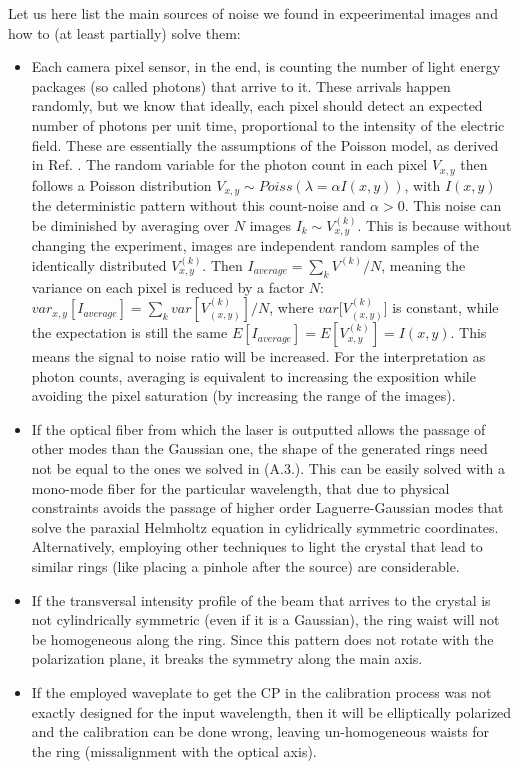 \documentclass[11pt, a4paper, twoside]{article} %
\begin{document}
Let us here list the main sources of noise we found in expeerimental images and how to (at least partially) solve them:
\begin{itemize}
\item Each camera pixel sensor, in the end, is counting the number of light energy packages (so called photons) that arrive to it. These arrivals happen randomly, but we know that ideally, each pixel should detect an expected number of photons per unit time, proportional to the intensity of the electric field. These are essentially the assumptions of the Poisson model, as derived in Ref. \cite{Poiss}. The random variable for the photon count in each pixel $V_{x,y}$ then follows a Poisson distribution $V_{x,y}\sim Poiss(\lambda=\alpha I(x,y))$, with $I(x,y)$ the deterministic pattern without this count-noise and $\alpha>0$. This noise can be diminished by averaging over $N$ images $I_k\sim V^{(k)}_{x,y}$. This is because without changing the experiment, images are independent random samples of the identically distributed $V^{(k)}_{x,y}$. Then $I_{average}=\sum_{k}V^{(k)}/N$, meaning the variance on each pixel is reduced by a factor $N$: $var_{x,y}[I_{average}]=\sum_k var[V_{(x,y)}^{(k)}]/N$, where $var[V_{(x,y)}^{(k)}$] is constant, while the expectation is still the same $E[I_{average}]=E[V_{x,y}^{(k)}]=I(x,y)$. This means the signal to noise ratio will be increased. For the interpretation as photon counts, averaging is equivalent to increasing the exposition while avoiding the pixel saturation (by increasing the range of the images).

\item If the optical fiber from which the laser is outputted allows the passage of other modes than the Gaussian one, the shape of the generated rings need not be equal to the ones we solved in (A.3.). This can be easily solved with a mono-mode fiber for the particular wavelength, that due to physical constraints avoids the passage of higher order Laguerre-Gaussian modes that solve the paraxial Helmholtz equation in cylidrically symmetric coordinates. Alternatively, employing other techniques to light the crystal that lead to similar rings (like placing a pinhole after the source) are considerable.

\item If the transversal intensity profile of the beam that arrives to the crystal is not cylindrically symmetric (even
if it is a Gaussian), the ring waist will not be homogeneous along the ring. Since this pattern does not rotate with the polarization plane, it breaks the symmetry along the main axis.
\item If the employed waveplate to get the CP in the calibration process was not exactly designed for the input wavelength, then it will be elliptically polarized and the calibration can be done wrong, leaving un-homogeneous waists for the ring (missalignment with the optical axis).


\end{itemize}
\end{document}
